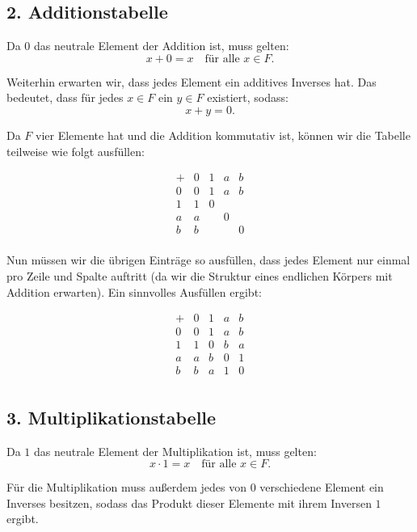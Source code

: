 \documentclass[11pt]{article}
\begin{document}
\subsection*{2. Additionstabelle}

Da \( 0 \) das neutrale Element der Addition ist, muss gelten:
\[
x + 0 = x \quad \text{für alle } x \in F.
\]

Weiterhin erwarten wir, dass jedes Element ein additives Inverses hat. Das bedeutet, dass für jedes \( x \in F \) ein \( y \in F \) existiert, sodass:
\[
x + y = 0.
\]

Da \( F \) vier Elemente hat und die Addition kommutativ ist, können wir die Tabelle teilweise wie folgt ausfüllen:

\[
\begin{array}{c|cccc}
    + & 0 & 1 & a & b \\
    \hline
    0 & 0 & 1 & a & b \\
    1 & 1 & 0 &  &  \\
    a & a &  & 0 &  \\
    b & b &  &  & 0 \\
\end{array}
\]

Nun müssen wir die übrigen Einträge so ausfüllen, dass jedes Element nur einmal pro Zeile und Spalte auftritt (da wir die Struktur eines endlichen Körpers mit Addition erwarten). Ein sinnvolles Ausfüllen ergibt:

\[
\begin{array}{c|cccc}
    + & 0 & 1 & a & b \\
    \hline
    0 & 0 & 1 & a & b \\
    1 & 1 & 0 & b & a \\
    a & a & b & 0 & 1 \\
    b & b & a & 1 & 0 \\
\end{array}
\]

\subsection*{3. Multiplikationstabelle}

Da \( 1 \) das neutrale Element der Multiplikation ist, muss gelten:
\[
x \cdot 1 = x \quad \text{für alle } x \in F.
\]

Für die Multiplikation muss außerdem jedes von \( 0 \) verschiedene Element ein Inverses besitzen, sodass das Produkt dieser Elemente mit ihrem Inversen \( 1 \) ergibt.
\end{document}
